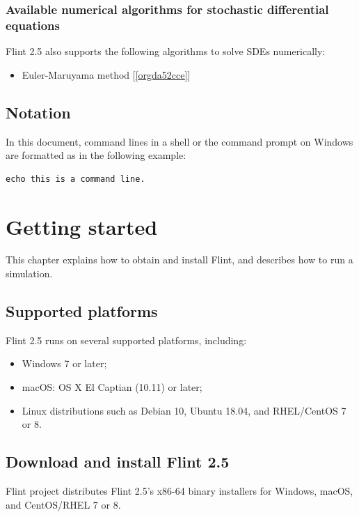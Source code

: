\documentclass[a4paper,10pt]{report}
\begin{document}
\subsection{Available numerical algorithms for stochastic differential equations}
\label{sec:org3d74916}
Flint 2.5 also supports the following algorithms to solve SDEs
numerically:

\begin{itemize}
\item Euler-Maruyama method [\ref{orgda52cce}]
\end{itemize}


\section{Notation}
\label{sec:orgc01fd30}
In this document, command lines in a shell or the command prompt on Windows are
formatted as in the following example:
\begin{verbatim}
echo this is a command line.
\end{verbatim}


\chapter{Getting started}
\label{sec:org001db73}

This chapter explains how to obtain and install Flint, and describes how to run
a simulation.

\section{Supported platforms}
\label{sec:org9e92f50}
Flint 2.5 runs on several supported platforms, including:

\begin{itemize}
\item Windows 7 or later;
\item macOS: OS X El Captian (10.11) or later;
\item Linux distributions such as Debian 10, Ubuntu 18.04, and RHEL/CentOS 7 or 8.
\end{itemize}


\section{Download and install Flint 2.5}
\label{sec:org4e98aab}
Flint project distributes Flint 2.5's x86-64 binary installers for Windows,
macOS, and CentOS/RHEL 7 or 8.
\end{document}
